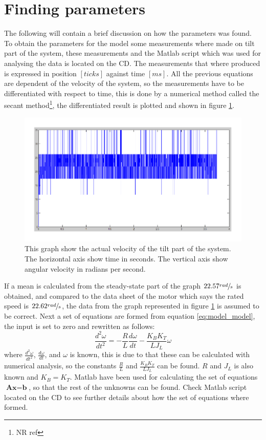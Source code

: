 \section{Finding parameters}
The following will contain a brief discussion on how the parameters was found. To obtain the parameters for the model some measurements where made on tilt part of the system, these measurements and the Matlab script which was used for analysing the data is located on the CD. The measurements that where produced is expressed in position $[ticks]$ against time $[ms]$. All the previous equations are dependent of the velocity of the system, so the measurements have to be differentiated with respect to time, this is done by a numerical method called the secant method\footnote{NR ref}, the differentiated result is plotted and shown in figure \ref{fig:measured_step_tilt}.
\begin{figure}[htb]
	\begin{center}
	\includegraphics[scale=1,trim=0 0 0 0]{graphics/measured_step_tilt.pdf} %
	\caption{This graph show the actual velocity of the tilt part of the system. The horizontal axis show time in seconds. The vertical axis show angular velocity in radians per second.}
	\label{fig:measured_step_tilt}			%
	\end{center}
\end{figure}
If a mean is calculated from the steady-state part of the graph $22.57 \sfrac{rad}{s}$ is obtained, and compared to the data sheet of the motor which says the rated speed is $22.62 \sfrac{rad}{s}$, the data from the graph represented in figure \ref{fig:measured_step_tilt} is assumed to be correct. Next a set of equations are formed from equation \ref{eq:model_model}, the input is set to zero and rewritten as follows:
\begin{equation}
	\frac{d^{2}\omega}{dt^{2}} = - \frac{R}{L} \frac{d\omega}{dt} - \frac{K_B K_T}{L J_L} \omega
\end{equation}
where $\frac{d^{2}\omega}{dt^{2}}$, $\frac{d\omega}{dt}$, and $\omega$ is known, this is due to that these can be calculated with numerical analysis, so the constants $\frac{R}{L}$ and $\frac{K_B K_T}{L J_L}$ can be found. $R$ and $J_L$ is also known and $K_B = K_T$. Matlab have been used for calculating the set of equations $\textbf{Ax} = \textbf{b}$, so that the rest of the unknowns can be found. Check Matlab script located on the CD to see further details about how the set of equations where formed.

